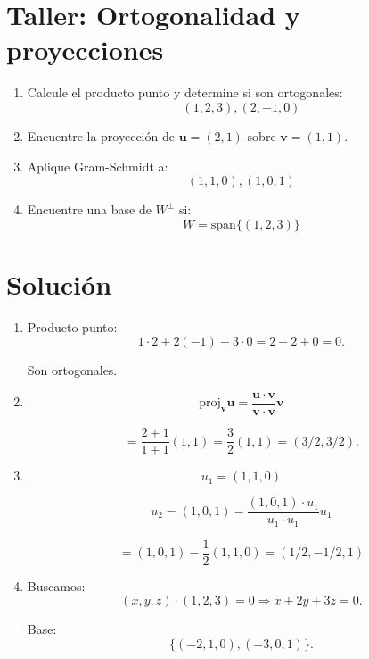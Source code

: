 \documentclass[12pt,letterpaper]{article}
\begin{document}
\section*{Taller: Ortogonalidad y proyecciones}

\begin{enumerate}

\item Calcule el producto punto y determine si son ortogonales:
\[
(1,2,3), (2,-1,0)
\]

\item Encuentre la proyección de $\mathbf{u}=(2,1)$ sobre $\mathbf{v}=(1,1)$.

\item Aplique Gram-Schmidt a:
\[
(1,1,0), (1,0,1)
\]

\item Encuentre una base de $W^\perp$ si:
\[
W = \text{span}\{(1,2,3)\}
\]

\end{enumerate}

\newpage

\section*{Solución}

\begin{enumerate}

\item Producto punto:
\[
1\cdot2 + 2(-1) + 3\cdot0 = 2-2+0=0.
\]

Son ortogonales.

\item 
\[
\text{proj}_{\mathbf{v}}\mathbf{u} =
\frac{\mathbf{u}\cdot \mathbf{v}}{\mathbf{v}\cdot \mathbf{v}}\mathbf{v}
\]

\[
= \frac{2+1}{1+1}(1,1) = \frac{3}{2}(1,1) = (3/2,3/2).
\]

\item 

\[
u_1 = (1,1,0)
\]

\[
u_2 = (1,0,1) - \frac{(1,0,1)\cdot u_1}{u_1\cdot u_1}u_1
\]

\[
= (1,0,1) - \frac{1}{2}(1,1,0)
= (1/2,-1/2,1)
\]

\item Buscamos:
\[
(x,y,z)\cdot(1,2,3)=0 \Rightarrow x+2y+3z=0.
\]

Base:
\[
\{(-2,1,0),(-3,0,1)\}.
\]

\end{enumerate}
\end{document}
